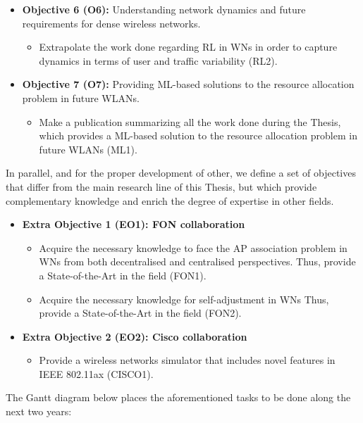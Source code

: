 \documentclass[12pt, a4paper,twoside]{tesi_upf}
\begin{document}
\begin{itemize}
\begin{itemize}
			\end{itemize}		
			\item \textbf{Objective 6 (O6):} Understanding network dynamics and future requirements for dense wireless networks.
			\begin{itemize}
				\item Extrapolate the work done regarding RL in WNs in order to capture dynamics in terms of user and traffic variability (RL2). 
			\end{itemize}		
			\item \textbf{Objective 7 (O7):} Providing ML-based solutions to the resource allocation problem in future WLANs.
			\begin{itemize}
				\item Make a publication summarizing all the work done during the Thesis, which provides a ML-based solution to the resource allocation problem in future WLANs (ML1).
			\end{itemize}		
		\end{itemize}
	
		In parallel, and for the proper development of other, we define a set of objectives that differ from the main research line of this Thesis, but which provide complementary knowledge and enrich the degree of expertise in other fields.
		\begin{itemize}
			\item \textbf{Extra Objective 1 (EO1): FON collaboration} 
			\begin{itemize}
				\item Acquire the necessary knowledge to face the AP association problem in WNs from both decentralised and centralised perspectives. Thus, provide a State-of-the-Art in the field (FON1).
				\item Acquire the necessary knowledge for self-adjustment in WNs Thus, provide a State-of-the-Art in the field (FON2).
			\end{itemize}
			\item \textbf{Extra Objective 2 (EO2): Cisco collaboration} 
			\begin{itemize}
				\item Provide a wireless networks simulator that includes novel features in IEEE 802.11ax (CISCO1).
			\end{itemize}
		\end{itemize}
	
		The Gantt diagram below places the aforementioned tasks to be done along the next two years:	
	
\end{document}
